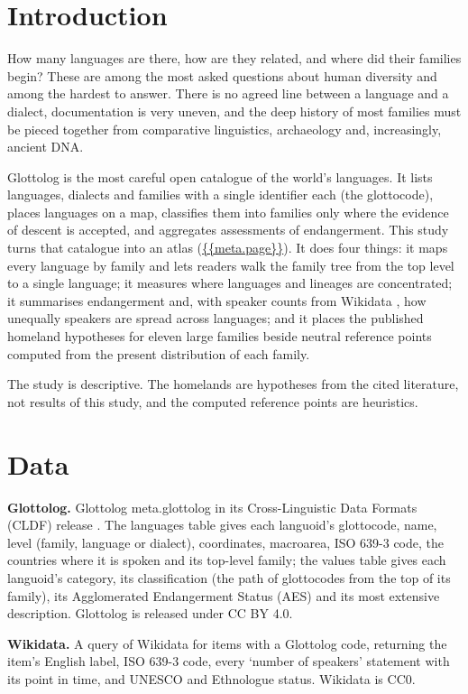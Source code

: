 \documentclass[11pt,a4paper]{article}
\begin{document}
\section{Introduction}
How many languages are there, how are they related, and where did their families begin? These are among the most asked questions about human diversity and among the hardest to answer. There is no agreed line between a language and a dialect, documentation is very uneven, and the deep history of most families must be pieced together from comparative linguistics, archaeology and, increasingly, ancient DNA.

Glottolog \citep{glottolog} is the most careful open catalogue of the world's languages. It lists languages, dialects and families with a single identifier each (the glottocode), places languages on a map, classifies them into families only where the evidence of descent is accepted, and aggregates assessments of endangerment. This study turns that catalogue into an atlas (\url{{{meta.page}}}). It does four things: it maps every language by family and lets readers walk the family tree from the top level to a single language; it measures where languages and lineages are concentrated; it summarises endangerment and, with speaker counts from Wikidata \citep{wikidata}, how unequally speakers are spread across languages; and it places the published homeland hypotheses for eleven large families beside neutral reference points computed from the present distribution of each family.

The study is descriptive. The homelands are hypotheses from the cited literature, not results of this study, and the computed reference points are heuristics.

\section{Data}
\textbf{Glottolog.} Glottolog {{meta.glottolog}} in its Cross-Linguistic Data Formats (CLDF) release \citep{glottolog}. The languages table gives each languoid's glottocode, name, level (family, language or dialect), coordinates, macroarea, ISO 639-3 code, the countries where it is spoken and its top-level family; the values table gives each languoid's category, its classification (the path of glottocodes from the top of its family), its Agglomerated Endangerment Status (AES) and its most extensive description. Glottolog is released under CC BY 4.0.

\textbf{Wikidata.} A query of Wikidata \citep{wikidata} for items with a Glottolog code, returning the item's English label, ISO 639-3 code, every `number of speakers' statement with its point in time, and UNESCO and Ethnologue status. Wikidata is CC0.
\end{document}
